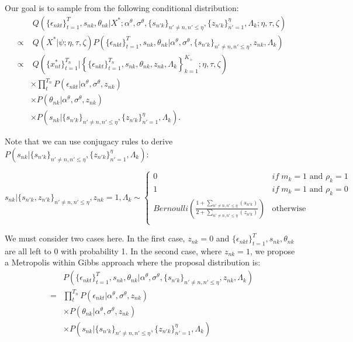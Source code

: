 \documentclass[12pt]{article}
\begin{document}
\begin{enumerate}
	Our goal is to sample from the following conditional distribution:
	\begin{align*}
	&\; Q \left(
	\{\epsilon_{nkt}\}_{t=1}^T, s_{nk}, \theta_{nk}| 
	X^*;
	\alpha^\theta,\sigma^\theta,\{s_{n'k}\}_{n' \neq n, n'\leq\eta},\{z_{n'k}\}_{n'=1}^\eta,\Lambda_k;
	\eta,\tau,\zeta
	\right) \\
	\propto & \; Q(X^*|\psi;\eta,\tau,\zeta) 	
		P\left(
			\{\epsilon_{nkt}\}_{t=1}^T, s_{nk}, \theta_{nk} |
			\alpha^\theta,\sigma^\theta,\{s_{n'k}\}_{n' \neq n, n'\leq\eta},z_{nk},\Lambda_k
		\right) \\
	\propto  &\; Q \left( \{x_{nt}^*\}_{t=1}^{T_n} | \left\{ \{\epsilon_{nkt}\}_{t=1}^{T_n}, s_{nk}, \theta_{nk}, z_{nk}, \Lambda_k \right\}_{k=1}^{K_+};
	\eta,\tau,\zeta \right) \\
	& \times \prod_{t}^{T_n} P(\epsilon_{nkt}|\alpha^\theta,\sigma^\theta,z_{nk}) \\
	& \times P(\theta_{nk}|\alpha^\theta,\sigma^\theta,z_{nk}) \\
	& \times P(s_{nk}|\{s_{n'k}\}_{n' \neq n, n'\leq\eta},\{z_{n'k}\}_{n'=1}^\eta,\Lambda_k).
	\end{align*}
	
	Note that we can use conjugacy rules to derive $P(s_{nk}|\{s_{n'k}\}_{n' \neq n, n'\leq\eta},\{z_{n'k}\}_{n'=1}^\eta,\Lambda_k)$:

	$$ s_{nk}|\{s_{n'k},z_{n'k}\}_{n' \neq n, n'\leq\eta},z_{nk}=1,\Lambda_k \sim \left\{ \begin{array}{cl}
	0 & if \; m_k=1 \text{ and } \rho_k=1\\
	1 & if \; m_k=1 \text{ and } \rho_k=0\\
	\displaystyle Bernoulli\left(\frac{1 + \sum_{n' \neq n, n'\leq\eta} (s_{n'k})}{2 + \sum_{n' \neq n, n'\leq\eta} (z_{n'k})}\right) & \text{otherwise}\\
	\end{array}\right.$$
	
	We must consider two cases here. In the first case, $z_{nk}=0$ and $\{\epsilon_{nkt}\}_{t=1}^T, s_{nk}, \theta_{nk}$ are all left to 0 with probability 1. In the second case, where $z_{nk}=1$, we propose a Metropolis within Gibbs approach where the proposal distribution is:
	\begin{align*}
	& P\left(
	\{\epsilon_{nkt}\}_{t=1}^T, s_{nk}, \theta_{nk} |
	\alpha^\theta,\sigma^\theta,\{s_{n'k}\}_{n' \neq n, n'\leq\eta},z_{nk},\Lambda_k
	\right) \\
	=	& \prod_{t}^{T_n} P(\epsilon_{nkt}|\alpha^\theta,\sigma^\theta,z_{nk}) \\
	& \times P(\theta_{nk}|\alpha^\theta,\sigma^\theta,z_{nk}) \\
	& \times P(s_{nk}|\{s_{n'k}\}_{n' \neq n, n'\leq\eta},\{z_{n'k}\}_{n'=1}^\eta,\Lambda_k) \\
	\end{align*}
	

\end{enumerate}
\end{document}
